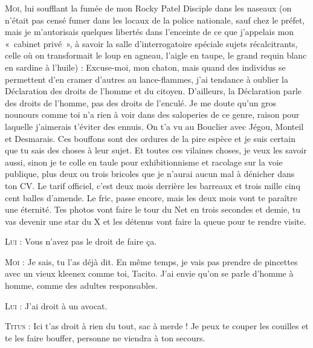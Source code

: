 \begin{dialogue}
\textsc{Moi}, lui soufflant la fumée de mon Rocky Patel Disciple dans les naseaux (on n’était pas censé fumer dans les locaux de la police nationale, sauf chez le préfet, mais je m’autorisais quelques libertés dans l’enceinte de ce que j’appelais mon «~cabinet privé~», à savoir la salle d’interrogatoire spéciale sujets récalcitrants, celle où on transformait le loup en agneau, l’aigle en taupe, le grand requin blanc en sardine à l’huile) : Excuse-moi, mon chaton, mais quand des individus se permettent d’en cramer d’autres au lance-flammes, j’ai tendance à oublier la Déclaration des droits de l’homme et du citoyen. D’ailleurs, la Déclaration parle des droits de l’homme, pas des droits de l’enculé. Je me doute qu’un gros nounours comme toi n’a rien à voir dans des saloperies de ce genre, raison pour laquelle j’aimerais t’éviter des ennuis. On t’a vu au Bouclier avec Jégou, Monteil et Desmarais. Ces bouffons sont des ordures de la pire espèce et je suis certain que tu sais des choses à leur sujet. Et toutes ces vilaines choses, je veux les savoir aussi, sinon je te colle en taule pour exhibitionnisme et racolage sur la voie publique, plus deux ou trois bricoles que je n’aurai aucun mal à dénicher dans ton CV. Le tarif officiel, c’est deux mois derrière les barreaux et trois mille cinq cent balles d’amende. Le fric, passe encore, mais les deux mois vont te paraître une éternité. Tes photos vont faire le tour du Net en trois secondes et demie, tu vas devenir une star du X et les détenus vont faire la queue pour te rendre visite.

\textsc{Lui} : Vous n’avez pas le droit de faire ça.

\textsc{Moi} : Je sais, tu l’as déjà dit. En même temps, je vais pas prendre de pincettes avec un vieux kleenex comme toi, Tacito. J’ai envie qu’on se parle d’homme à homme, comme des adultes responsables.

\textsc{Lui} : J’ai droit à un avocat.

\textsc{Titus} : Ici t’as droit à rien du tout, sac à merde ! Je peux te couper les couilles et te les faire bouffer, personne ne viendra à ton secours.

\end{dialogue}

